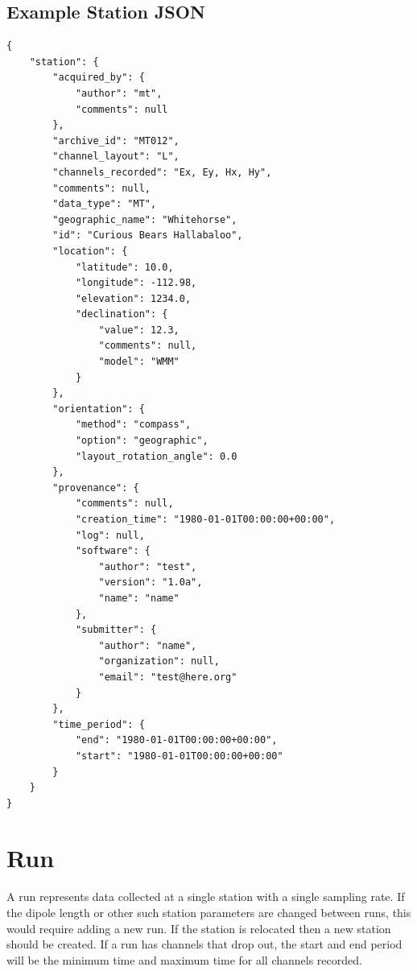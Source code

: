 \documentclass{article}
\begin{document}
\clearpage   
\newpage
\subsection{Example Station JSON}

\begin{verbatim}
{
    "station": {
        "acquired_by": {
            "author": "mt",
            "comments": null
        },
        "archive_id": "MT012",
        "channel_layout": "L",
        "channels_recorded": "Ex, Ey, Hx, Hy",
        "comments": null,
        "data_type": "MT",
        "geographic_name": "Whitehorse",
        "id": "Curious Bears Hallabaloo",
        "location": {
            "latitude": 10.0,
            "longitude": -112.98,
            "elevation": 1234.0,
            "declination": {
                "value": 12.3,
                "comments": null,
                "model": "WMM"
            }
        },
        "orientation": {
            "method": "compass",
            "option": "geographic",
            "layout_rotation_angle": 0.0
        },
        "provenance": {
            "comments": null,
            "creation_time": "1980-01-01T00:00:00+00:00",
            "log": null,
            "software": {
                "author": "test",
                "version": "1.0a",
                "name": "name"
            },
            "submitter": {
                "author": "name",
                "organization": null,
                "email": "test@here.org"
            }
        },
        "time_period": {
            "end": "1980-01-01T00:00:00+00:00",
            "start": "1980-01-01T00:00:00+00:00"
        }
    }
}
\end{verbatim}

\newpage
\section{Run}

A run represents data collected at a single station with a single sampling rate. If the dipole length or other such station parameters are changed between runs, this would require adding a new run.  If the station is relocated then a new station should be created.  If a run has channels that drop out, the start and end period will be the minimum time and maximum time for all channels recorded. 
\end{document}
